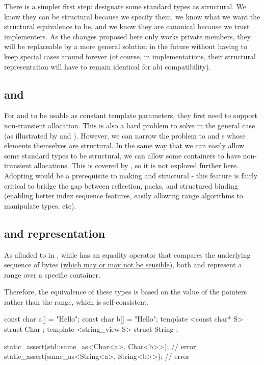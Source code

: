 \documentclass{wg21}
\begin{document}
There is a simpler first step: designate some standard types as structural.
We know they can be structural because we specify them, we know what we want the structural equivalence to be, and we know they are canonical
because we trust implementers.
As the changes proposed here only works private members, they will be replaceable by a more general solution in the future without having to keep special cases around forever (of course, in implementations, their structural representation will have to remain identical for abi compatibility).


\subsection{ and }

For  and  to be usable as constant template parameters, they first need to support non-transient allocation.
This is also a hard problem to solve in the general case (as illustrated by  and ). However, we can narrow the problem to  and s
whose elements themselves are structural.
In the same way that we can easily allow some standard types to be structural, we can allow some containers to have non-transient allocations.
This is covered by , so it is not explored further here. Adopting  would be a prerequisite to making  and  structural - this feature is fairly critical to bridge the gap between reflection, packs, and structured binding (enabling better index sequence features, easily allowing range algorithms to manipulate types, etc).

\subsection{ and  representation}

As alluded to in , while  has an equality operator that compares the underlying sequence of bytes (\href{https://abseil.io/blog/20180531-regular-types}{which may or may not be sensible}),
both  and  represent a range over a specific container.

Therefore, the equivalence of these types is based on the value of the pointers rather than the range, which is self-consistent.

\begin{colorblock}
const char a[] = "Hello";
const char b[] = "Hello";
template <const char* S> struct Char   {};
template <string_view S> struct String {};

static_assert(std::same_as<Char<a>, Char<b>>); // error
static_assert(same_as<String<a>, String<b>>);  // error
\end{colorblock}
\end{document}
